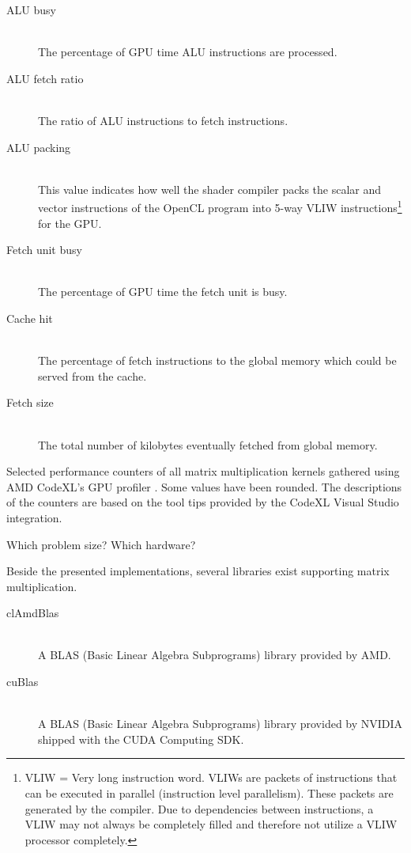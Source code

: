 \begin{table}
\begin{description}
		   \item[ALU busy] \hfill \\
		   The percentage of GPU time ALU instructions are processed.
		   \item[ALU fetch ratio] \hfill \\
		   The ratio of ALU instructions to fetch instructions.
		   \item[ALU packing] \hfill \\
		   This value indicates how well the shader compiler packs the scalar and vector instructions of the OpenCL program into 5-way VLIW instructions\footnote{VLIW = Very long instruction word. VLIWs are packets of instructions that can be executed in parallel (instruction level parallelism). These packets are generated by the compiler. Due to dependencies between instructions, a VLIW may not always be completely filled and therefore not utilize a VLIW processor completely.} for the GPU.
		   \item[Fetch unit busy] \hfill \\
		   The percentage of GPU time the fetch unit is busy.
		   \item[Cache hit] \hfill \\
		   The percentage of fetch instructions to the global memory which could be served from the cache.
		   \item[Fetch size] \hfill \\
		   The total number of kilobytes eventually fetched from global memory.
		\end{description}
	\caption{Selected performance counters of all matrix multiplication kernels gathered using AMD CodeXL's GPU profiler \cite{amd_codexl}. Some values have been rounded. The descriptions of the counters are based on the tool tips provided by the CodeXL Visual Studio integration.}
	\label{tbl:matrix_perf_counter}
\end{table}

Which problem size?
Which hardware?

Beside the presented implementations, several libraries exist supporting matrix multiplication.

\begin{description}
   \item[clAmdBlas] \hfill \\
   A BLAS (Basic Linear Algebra Subprograms) library provided by AMD.
   \item[cuBlas] \hfill \\
   A BLAS (Basic Linear Algebra Subprograms) library provided by NVIDIA shipped with the CUDA Computing SDK.
\end{description}

